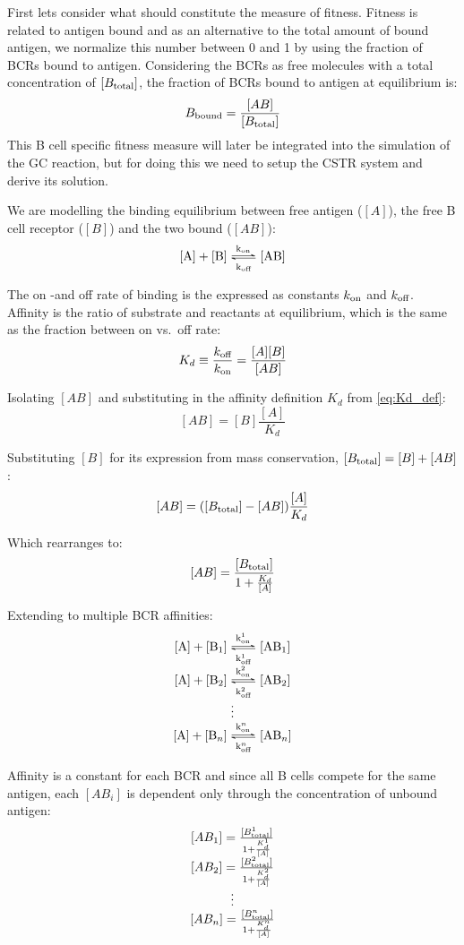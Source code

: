 First lets consider what should constitute the measure of fitness.
Fitness is related to antigen bound and as an alternative to the total amount of bound antigen, we normalize this number between 0 and 1 by using the fraction of BCRs bound to antigen.
Considering the BCRs as free molecules with a total concentration of $[B_{\text{total}}]$, the fraction of BCRs bound to antigen at equilibrium is:
$$
B_{\text{bound}} = \frac{[AB]}{[B_{\text{total}}]}
$$
This B cell specific fitness measure will later be integrated into the simulation of the GC reaction, but for doing this we need to setup the CSTR system and derive its solution.


\noindent
We are modelling the binding equilibrium between free antigen ($[A]$), the free B cell receptor ($[B]$) and the two bound ($[AB]$):
\begin{equation}
\ce{[A] + [B] <=>[k_{\on}][k_{\off}] [AB]}
  \label{eq:bind1}
\end{equation}

\noindent
The on -and off rate of binding is the expressed as constants $k_{\text{on}}$ and $k_{\text{off}}$. Affinity is the ratio of substrate and reactants at equilibrium, which is the same as the fraction between on vs.\ off rate:
\begin{equation}
K_d \equiv \frac{k_{\text{off}}}{k_{\text{on}}} = \frac{[A] [B]}{[AB]}
  \label{eq:Kd_def}
\end{equation}

\noindent
Isolating $[AB]$ and substituting in the affinity definition $K_d$ from \eqref{eq:Kd_def}:
$$
[AB] = [B] \frac{[A]}{K_d}
$$

\noindent
Substituting $[B]$ for its expression from mass conservation, $[B_{\text{total}}] = [B] + [AB]$:
$$
[AB] = ([B_{\text{total}}] - [AB]) \frac{[A]}{K_d}
$$

\noindent
Which rearranges to:
$$
[AB] = \frac{[B_{\text{total}}]}{1 + \frac{K_d}{[A]}}
$$

\noindent
Extending to multiple BCR affinities:
\[
 \begin{matrix}
  \ce{[A] + [B_1] <=>[k^1_{\on}][k^1_{\off}] [AB_1]} \\
  \ce{[A] + [B_2] <=>[k^2_{\on}][k^2_{\off}] [AB_2]} \\
  \vdots \\
  \ce{[A] + [B_n] <=>[k^n_{\on}][k^n_{\off}] [AB_n]}
  \label{eq:ABi}
 \end{matrix}
\]

\noindent
Affinity is a constant for each BCR and since all B cells compete for the same antigen, each $[AB_i]$ is dependent only through the concentration of unbound antigen:
\[
 \begin{matrix}
  [AB_1] = \frac{[B^1_{\text{total}}]}{1 + \frac{K^1_d}{[A]}} \\
  [AB_2] = \frac{[B^2_{\text{total}}]}{1 + \frac{K^2_d}{[A]}} \\
  \vdots \\
  [AB_n] = \frac{[B^n_{\text{total}}]}{1 + \frac{K^n_d}{[A]}} \\
 \end{matrix}
\]

